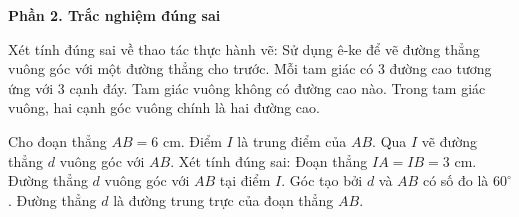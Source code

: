 \textbf{Phần 2. Trắc nghiệm đúng sai}

\begin{ex} %
Xét tính đúng sai về thao tác thực hành vẽ:
\choiceTF
{\True Sử dụng ê-ke để vẽ đường thẳng vuông góc với một đường thẳng cho trước.}
{\True Mỗi tam giác có 3 đường cao tương ứng với 3 cạnh đáy.}
{Tam giác vuông không có đường cao nào.}
{\True Trong tam giác vuông, hai cạnh góc vuông chính là hai đường cao.}
\end{ex}

\begin{ex} %
Cho đoạn thẳng $AB = 6\text{ cm}$. Điểm $I$ là trung điểm của $AB$. Qua $I$ vẽ đường thẳng $d$ vuông góc với $AB$. Xét tính đúng sai:
\choiceTF
{\True Đoạn thẳng $IA = IB = 3\text{ cm}$.}
{\True Đường thẳng $d$ vuông góc với $AB$ tại điểm $I$.}
{Góc tạo bởi $d$ và $AB$ có số đo là $60^\circ$.}
{\True Đường thẳng $d$ là đường trung trực của đoạn thẳng $AB$.}
\end{ex}

